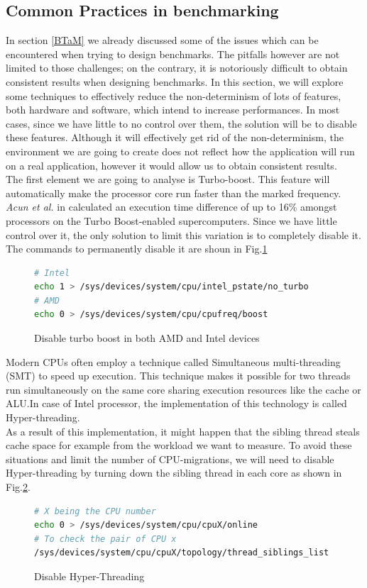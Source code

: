 \subsection{Common Practices in benchmarking}\label{sec:ben_challenges} \label{sec:remove_inter}
In section \ref{BTaM} we already discussed some of the issues which can be encountered when trying to design benchmarks. The pitfalls however are not limited to those challenges; on the contrary, it is notoriously difficult to obtain consistent results when designing benchmarks. In this section, we will explore some techniques to effectively reduce the non-determinism of lots of features, both hardware and software, which intend to increase performances. In most cases, since we have little to no control over them, the solution will be to disable these features. Although it will effectively get rid of the non-determinism, the environment we are going to create does not reflect how the application will run on a real application, however it would allow us to obtain consistent results. \\
The first element we are going to analyse is Turbo-boost. This feature will automatically make the processor core run faster than the marked frequency. \textit{Acun et al.} in \cite{turbo_boost} calculated an execution time difference of up to 16\% amongst processors on the Turbo Boost-enabled supercomputers. Since we have little control over it, the only solution to limit this variation is to completely disable it. The commands to permanently disable it are shoun in Fig.\ref{fig:no_boos}
\begin{figure}[h]
\begin{lstlisting}[language=bash]
# Intel
echo 1 > /sys/devices/system/cpu/intel_pstate/no_turbo
# AMD
echo 0 > /sys/devices/system/cpu/cpufreq/boost
\end{lstlisting}
\caption{Disable turbo boost in both AMD and Intel devices}
\label{fig:no_boos}
\end{figure}

Modern CPUs often employ a technique called Simultaneous multi-threading (SMT) to speed up execution. This technique makes it possible for two threads run simultaneously on the same core sharing execution resources like the cache or ALU.In case of Intel processor, the implementation of this technology is called Hyper-threading.\\
As a result of this implementation, it might happen that the sibling thread steals cache space for example from the workload we want to measure. To avoid these situations and limit the number of CPU-migrations, we will need to disable Hyper-threading by turning down the sibling thread in each core as shown in Fig.\ref{fig:no_ht}. 
\begin{figure}[h]
\begin{lstlisting}[language=bash]
# X being the CPU number
echo 0 > /sys/devices/system/cpu/cpuX/online
# To check the pair of CPU x
/sys/devices/system/cpu/cpuX/topology/thread_siblings_list
\end{lstlisting}
\caption{Disable Hyper-Threading}
\label{fig:no_ht}
\end{figure}

